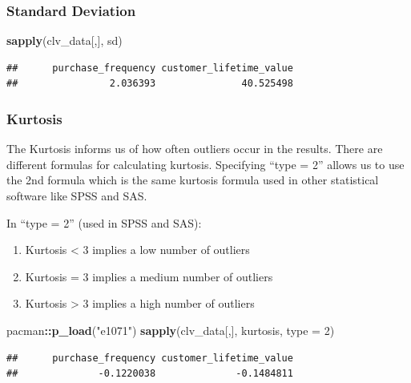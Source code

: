 \documentclass[
]{article}
\newenvironment{Shaded}{\begin{snugshade}}{\end{snugshade}}
\newcommand{\AttributeTok}[1]{\textcolor[rgb]{0.13,0.29,0.53}{#1}}
\newcommand{\DecValTok}[1]{\textcolor[rgb]{0.00,0.00,0.81}{#1}}
\newcommand{\FunctionTok}[1]{\textcolor[rgb]{0.13,0.29,0.53}{\textbf{#1}}}
\newcommand{\NormalTok}[1]{#1}
\newcommand{\SpecialCharTok}[1]{\textcolor[rgb]{0.81,0.36,0.00}{\textbf{#1}}}
\newcommand{\StringTok}[1]{\textcolor[rgb]{0.31,0.60,0.02}{#1}}
\begin{document}
\subsubsection{\texorpdfstring{\textbf{Standard
Deviation}}{Standard Deviation}}\label{standard-deviation}

\begin{Shaded}
\begin{Highlighting}[]
\FunctionTok{sapply}\NormalTok{(clv\_data[,], sd)}
\end{Highlighting}
\end{Shaded}

\begin{verbatim}
##      purchase_frequency customer_lifetime_value 
##                2.036393               40.525498
\end{verbatim}

\subsubsection{\texorpdfstring{\textbf{Kurtosis}}{Kurtosis}}\label{kurtosis}

The Kurtosis informs us of how often outliers occur in the results.
There are different formulas for calculating kurtosis. Specifying ``type
= 2'' allows us to use the 2nd formula which is the same kurtosis
formula used in other statistical software like SPSS and SAS.

In ``type = 2'' (used in SPSS and SAS):

\begin{enumerate}
\def\labelenumi{\arabic{enumi}.}
\item
  Kurtosis \textless{} 3 implies a low number of outliers
\item
  Kurtosis = 3 implies a medium number of outliers
\item
  Kurtosis \textgreater{} 3 implies a high number of outliers
\end{enumerate}

\begin{Shaded}
\begin{Highlighting}[]
\NormalTok{pacman}\SpecialCharTok{::}\FunctionTok{p\_load}\NormalTok{(}\StringTok{"e1071"}\NormalTok{)}
\FunctionTok{sapply}\NormalTok{(clv\_data[,],  kurtosis, }\AttributeTok{type =} \DecValTok{2}\NormalTok{)}
\end{Highlighting}
\end{Shaded}

\begin{verbatim}
##      purchase_frequency customer_lifetime_value 
##              -0.1220038              -0.1484811
\end{verbatim}
\end{document}
